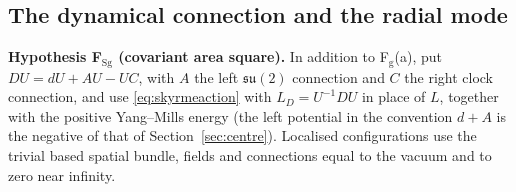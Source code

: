 \documentclass[aps,pra,onecolumn,superscriptaddress,nofootinbib,10pt]{revtex4-2}
\theoremstyle{definition}
\theoremstyle{remark}
\newcommand{\su}{\mathfrak{su}}
\begin{document}
\subsection{The dynamical connection and the radial mode}

\smallskip\noindent\textbf{Hypothesis F$_{\mathrm{Sg}}$ (covariant area square).}\label{hyp:FSg}  In addition to F$_{\mathrm g}$(a), put $DU=dU+AU-UC$, with $A$
the left $\su(2)$ connection and $C$ the right clock connection, and use \eqref{eq:skyrmeaction} with $L_D=U^{-1}DU$ in place of $L$,
together with the positive Yang--Mills energy (the left potential in the convention $d+A$ is the negative of
that of Section~\ref{sec:centre}).  Localised configurations use the trivial based spatial bundle, fields and
connections equal to the vacuum and to zero near infinity.
\end{document}
